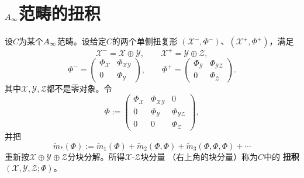 
\section{\texorpdfstring{$A_{\infty}$范畴的扭积}{A∞ 范畴的扭积}}
\label{sec:c04-5}

\begin{definition}\label{def:c04-5.1}
设$C$为某个$A_{\infty}$范畴。设给定$C$的两个单侧扭复形
$(\mathcal{X}^{-},\Phi^{-})$、$(\mathcal{X}^{+},\Phi^{+})$，满足
\[
\mathcal{X}^{-}=\mathcal{X}\oplus\mathcal{Y},\qquad
\mathcal{X}^{+}=\mathcal{Y}\oplus\mathcal{Z},
\]
\[
\Phi^{-}=
\begin{pmatrix}
\Phi_{\mathcal{X}} & \Phi_{\mathcal{X}\mathcal{Y}}\\
0 & \Phi_{\mathcal{Y}}
\end{pmatrix},\qquad
\Phi^{+}=
\begin{pmatrix}
\Phi_{\mathcal{Y}} & \Phi_{\mathcal{Y}\mathcal{Z}}\\
0 & \Phi_{\mathcal{Z}}
\end{pmatrix}.
\]
其中$\mathcal{X},\mathcal{Y},\mathcal{Z}$都不是零对象。令
\[
\Phi:=
\begin{pmatrix}
\Phi_{\mathcal{X}} & \Phi_{\mathcal{X}\mathcal{Y}} & 0\\
0 & \Phi_{\mathcal{Y}} & \Phi_{\mathcal{Y}\mathcal{Z}}\\
0 & 0 & \Phi_{\mathcal{Z}}
\end{pmatrix},
\]
并把
\[
\tilde{m}_{*}(\Phi):=\tilde{m}_{1}(\Phi)+\tilde{m}_{2}(\Phi,\Phi)
+\tilde{m}_{3}(\Phi,\Phi,\Phi)+\cdots
\]
重新按$\mathcal{X}\oplus\mathcal{Y}\oplus\mathcal{Z}$分块分解。所得$\mathcal{X}$-$\mathcal{Z}$块分量
（右上角的块分量）称为$C$中的
\textbf{扭积}$(\mathcal{X},\mathcal{Y},\mathcal{Z};\Phi)$。
\end{definition}


